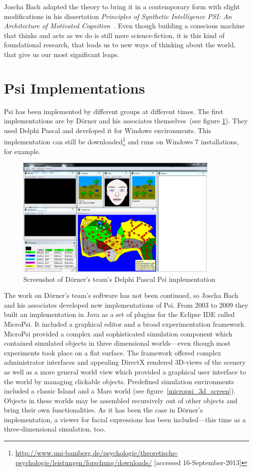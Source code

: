Joscha Bach adapted the theory to bring it in a contemporary form with slight modifications in his dissertation \emph{Principles of Synthetic Intelligence PSI: An Architecture of Motivated Cognition}~\cite{Bach:2009:PSI:1611304}. Even though building a conscious machine that thinks and acts as we do is still mere science-fiction, it is this kind of foundational research, that leads us to new ways of thinking about the world, that give us our most significant leaps.
    
    \section{Psi Implementations}
Psi has been implemented by different groups at different times. The first implementations are by Dörner and his associates themselves~(see figure \ref{psi_screen}). They used Delphi Pascal and developed it for Windows environments. This implementation can still be downloaded\footnote{\url{http://www.uni-bamberg.de/psychologie/theoretische-psychologie/leistungen/forschung/downloads/} [accessed 16-September-2013]} and runs on Windows 7 installations, for example. 

\begin{figure}[h]
  \centering
    \includegraphics[width=10cm]{graphics/psi_screen1}
  \caption[Screenshot of Dörner's Psi implementation]{Screenshot of Dörner's team's Delphi Pascal Psi implementation}
  \label{psi_screen}
\end{figure}

The work on Dörner's team's software has not been continued, so Joscha Bach and his associates developed new implementations of Psi. From 2003 to 2009 they built an implementation in Java as a set of plugins for the Eclipse IDE called MicroPsi. It included a graphical editor and a broad experimentation framework. MicroPsi provided a complex and sophisticated simulation component which contained simulated objects in three dimensional worlds---even though most experiments took place on a flat surface. The framework offered complex administrator interfaces and appealing DirectX rendered 3D-views of the scenery as well as a more general world view which provided a graphical user interface to the world by managing clickable objects. Predefined simulation environments included a classic Island and a Mars world (see figure~\ref{micropsi_3d_screen}). Objects in these worlds may be assembled recursively out of other objects and bring their own functionalities. As it has been the case in Dörner's implementation, a viewer for facial expressions has been included---this time as a three-dimensional simulation, too.~\cite{Bach:2009:PSI:1611304}


